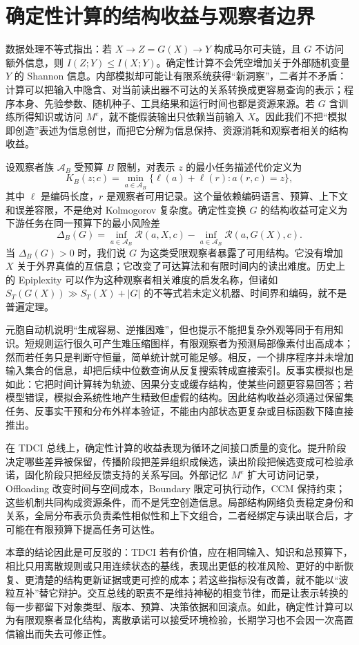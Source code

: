 \section{确定性计算的结构收益与观察者边界}
\label{sec:section_7007}

数据处理不等式指出：若 $X\rightarrow Z=G(X)\rightarrow Y$ 构成马尔可夫链，且 $G$ 不访问额外信息，则 $I(Z;Y)\le I(X;Y)$。确定性计算不会凭空增加关于外部随机变量 $Y$ 的 Shannon 信息。内部模拟却可能让有限系统获得“新洞察”，二者并不矛盾：计算可以把输入中隐含、对当前读出器不可达的关系转换成更容易查询的表示；程序本身、先验参数、随机种子、工具结果和运行时间也都是资源来源。若 $G$ 含训练所得知识或访问 $M^e$，就不能假装输出只依赖当前输入 $X$。因此我们不把“模拟即创造”表述为信息创世，而把它分解为信息保持、资源消耗和观察者相关的结构收益。

设观察者族 $\mathcal{A}_B$ 受预算 $B$ 限制，对表示 $z$ 的最小任务描述代价定义为
\[
K_B(z;c)=\min_{a\in\mathcal{A}_B}\{\ell(a)+\ell(r):a(r,c)=z\},
\]
其中 $\ell$ 是编码长度，$r$ 是观察者可用记录。这个量依赖编码语言、预算、上下文和误差容限，不是绝对 Kolmogorov 复杂度。确定性变换 $G$ 的结构收益可定义为下游任务在同一预算下的最小风险差
\[
\Delta_B(G)=\inf_{a\in\mathcal{A}_B}\mathcal R(a,X,c)-
\inf_{a\in\mathcal{A}_B}\mathcal R(a,G(X),c).
\]
当 $\Delta_B(G)>0$ 时，我们说 $G$ 为这类受限观察者暴露了可用结构。它没有增加 $X$ 关于外界真值的互信息；它改变了可达算法和有限时间内的读出难度。历史上的 Epiplexity 可以作为这种观察者相关难度的启发名称，但诸如 $S_T(G(X))\gg S_T(X)+|G|$ 的不等式若未定义机器、时间界和编码，就不是普遍定理。

元胞自动机说明“生成容易、逆推困难”，但也提示不能把复杂外观等同于有用知识。短规则运行很久可产生难压缩图样，有限观察者为预测局部像素付出高成本；然而若任务只是判断守恒量，简单统计就可能足够。相反，一个排序程序并未增加输入集合的信息，却把后续中位数查询从反复搜索转成直接索引。反事实模拟也是如此：它把时间计算转为轨迹、因果分支或缓存结构，使某些问题更容易回答；若模型错误，模拟会系统性地产生精致但虚假的结构。因此结构收益必须通过保留集任务、反事实干预和分布外样本验证，不能由内部状态更复杂或目标函数下降直接推出。

在 TDCI 总线上，确定性计算的收益表现为循环之间接口质量的变化。提升阶段决定哪些差异被保留，传播阶段把差异组织成候选，读出阶段把候选变成可检验承诺，固化阶段只把经反馈支持的关系写回。外部记忆 $M^e$ 扩大可访问记录，Offloading 改变时间与空间成本，Boundary 限定可执行动作，CCM 保持约束；这些机制共同构成资源条件，而不是凭空创造信息。局部结构网络负责稳定身份和关系，全局分布表示负责柔性相似性和上下文组合，二者经绑定与读出联合后，才可能在有限预算下提高任务可达性。

本章的结论因此是可反驳的：TDCI 若有价值，应在相同输入、知识和总预算下，相比只用离散规则或只用连续状态的基线，表现出更低的校准风险、更好的中断恢复、更清楚的结构更新证据或更可控的成本；若这些指标没有改善，就不能以“波粒互补”替它辩护。交互总线的职责不是维持神秘的相变节律，而是让表示转换的每一步都留下对象类型、版本、预算、决策依据和回滚点。如此，确定性计算可以为有限观察者显化结构，离散承诺可以接受环境检验，长期学习也不会因一次高置信输出而失去可修正性。

